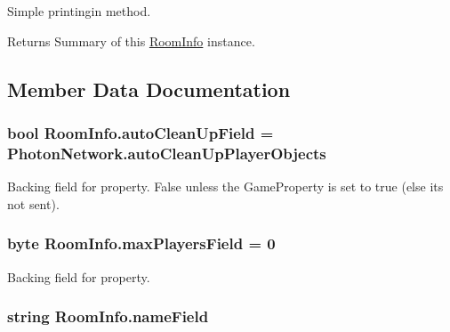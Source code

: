 Simple printingin method. 

\begin{DoxyReturn}{Returns}
Summary of this \hyperlink{class_room_info}{Room\+Info} instance.
\end{DoxyReturn}


\subsection{Member Data Documentation}
\subsubsection[{\texorpdfstring{auto\+Clean\+Up\+Field}{autoCleanUpField}}]{\setlength{\rightskip}{0pt plus 5cm}bool Room\+Info.\+auto\+Clean\+Up\+Field = {\bf Photon\+Network.\+auto\+Clean\+Up\+Player\+Objects}\hspace{0.3cm}{\ttfamily [protected]}}\hypertarget{class_room_info_ad4cd6791bdb87d9af9b2bf37bee89c90}{}\label{class_room_info_ad4cd6791bdb87d9af9b2bf37bee89c90}


Backing field for property. False unless the Game\+Property is set to true (else it\textquotesingle{}s not sent).

\subsubsection[{\texorpdfstring{max\+Players\+Field}{maxPlayersField}}]{\setlength{\rightskip}{0pt plus 5cm}byte Room\+Info.\+max\+Players\+Field = 0\hspace{0.3cm}{\ttfamily [protected]}}\hypertarget{class_room_info_a46f07a9998e906a0adb4f45bb94f1994}{}\label{class_room_info_a46f07a9998e906a0adb4f45bb94f1994}


Backing field for property.

\subsubsection[{\texorpdfstring{name\+Field}{nameField}}]{\setlength{\rightskip}{0pt plus 5cm}string Room\+Info.\+name\+Field\hspace{0.3cm}{\ttfamily [protected]}}\hypertarget{class_room_info_a4a091adee00339d328654b93821ba49e}{}\label{class_room_info_a4a091adee00339d328654b93821ba49e}


